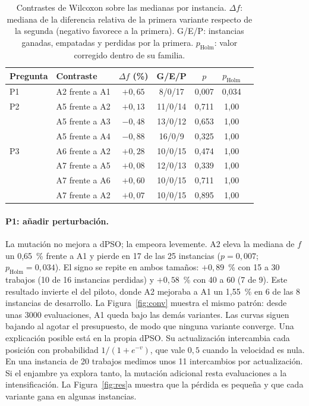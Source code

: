 \documentclass[10pt,a4paper]{article}
\newcommand{\dc}{{,}}%
\begin{document}
\begin{table}[htb]
\centering\small
\caption{Contrastes de Wilcoxon sobre las medianas por instancia. $\Delta f$: mediana de la
diferencia relativa de la primera variante respecto de la segunda (negativo favorece a la
primera). G/E/P: instancias ganadas, empatadas y perdidas por la primera. $p_{\text{Holm}}$:
valor corregido dentro de su familia.}
\label{tab:con}
\begin{tabular}{@{}llccccc@{}}
\toprule
Pregunta & Contraste & $\Delta f$ (\%) & G/E/P & $p$ & $p_{\text{Holm}}$ \\
\midrule
P1 & A2 frente a A1 & $+0{,}65$ & 8/0/17  & 0,007 & 0,034 \\
P2 & A5 frente a A2 & $+0{,}13$ & 11/0/14 & 0,711 & 1,00 \\
   & A5 frente a A3 & $-0{,}48$ & 13/0/12 & 0,653 & 1,00 \\
   & A5 frente a A4 & $-0{,}88$ & 16/0/9  & 0,325 & 1,00 \\
P3 & A6 frente a A2 & $+0{,}28$ & 10/0/15 & 0,474 & 1,00 \\
   & A7 frente a A5 & $+0{,}08$ & 12/0/13 & 0,339 & 1,00 \\
   & A7 frente a A6 & $+0{,}60$ & 10/0/15 & 0,711 & 1,00 \\
   & A7 frente a A2 & $+0{,}07$ & 10/0/15 & 0,895 & 1,00 \\
\bottomrule
\end{tabular}
\end{table}

\paragraph{P1: añadir perturbación.}
La mutación no mejora a dPSO; la empeora levemente. A2 eleva la mediana de $f$ un 0,65~\%
frente a A1 y pierde en 17 de las 25 instancias ($p=0\dc007$; $p_{\text{Holm}}=0\dc034$). El
signo se repite en ambos tamaños: $+0{,}89$~\% con 15 a 30 trabajos (10 de 16 instancias
perdidas) y $+0{,}58$~\% con 40 a 60 (7 de 9). Este resultado invierte el del piloto, donde A2
mejoraba a A1 un 1,55~\% en 6 de las 8 instancias de desarrollo. La Figura~\ref{fig:conv}
muestra el mismo patrón: desde unas 3000 evaluaciones, A1 queda bajo las demás variantes. Las
curvas siguen bajando al agotar el presupuesto, de modo que ninguna variante converge. Una
explicación posible está en la propia dPSO. Su actualización intercambia cada posición con
probabilidad $1/(1+e^{-v})$, que vale $0\dc5$ cuando la velocidad es nula. En una instancia de 20
trabajos medimos unos 11 intercambios por actualización. Si el enjambre ya explora tanto, la
mutación adicional resta evaluaciones a la intensificación. La Figura~\ref{fig:res}a muestra que
la pérdida es pequeña y que cada variante gana en algunas instancias.
\end{document}
